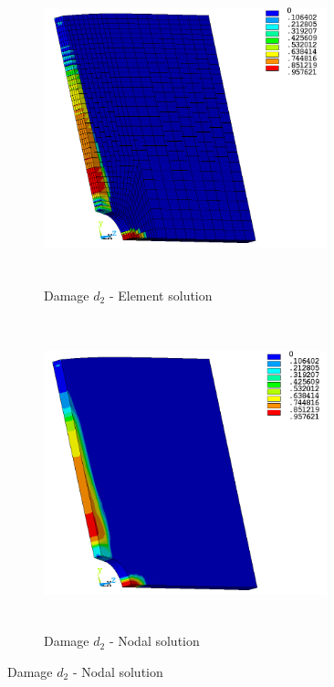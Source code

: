 \documentclass[12pt,a4paper,twoside,openright]{report}
\begin{document}
\FloatBarrier
\vspace*{1.5cm}
\begin{figure}[htbp!]\ContinuedFloat     
     \begin{subfigure}[b]{0.4\textwidth}
        \includegraphics[width=8.2cm,height=9cm]{27.d2-lt-e.png}
         \caption{Damage $d_{2}$ - Element solution}
         \label{fig:d2-lt-e}
     \end{subfigure}
    \hspace{1.9cm}
      \begin{subfigure}[b]{0.4\textwidth}
         \includegraphics[width=8.2cm,height=9cm]{27.d2-lt-n.png}
         \caption{Damage $d_{2}$ - Nodal solution}
         \label{fig:d2-lt-n}
     \end{subfigure}
\end{figure}
\FloatBarrier
\end{document}
